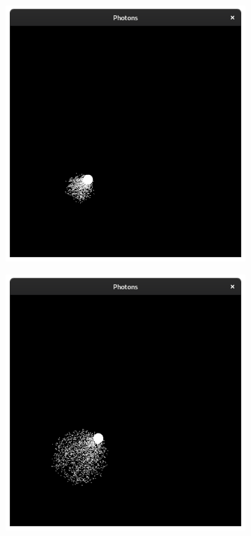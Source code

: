 \documentclass{stdlocal}
\begin{document}
\begin{figure}[p]
\begin{subfigure}[b]{0.24\textwidth}
        \includegraphics[width=\textwidth,trim={0 0 0 2cm},clip]{images/photons_2_02.png}
      \end{subfigure}
      \begin{subfigure}[b]{0.24\textwidth}
        \center
        \includegraphics[width=\textwidth,trim={0 0 0 2cm},clip]{images/photons_2_03.png}

\end{subfigure}
\end{figure}
\end{document}
